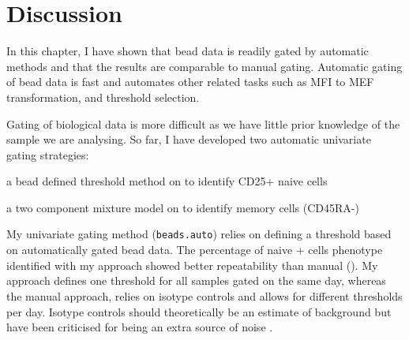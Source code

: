 \section{Discussion}

%
In this chapter, I have shown that bead data is readily gated by automatic methods and that the results are comparable to manual gating.
Automatic gating of bead data is fast and automates other related tasks such as MFI to MEF transformation, and threshold selection.

Gating of biological data is more difficult as we have little prior knowledge of the sample we are analysing.
So far, I have developed two automatic univariate gating strategies:
\begin{itemise}
\item a bead defined threshold method on  to identify CD25+ naive cells
\item a two component mixture model on  to identify memory cells (CD45RA-)
\end{itemise}

My  univariate gating method (\texttt{beads.auto}) relies on defining a threshold based on automatically gated bead data.
The percentage of naive + cells phenotype identified with my approach showed better repeatability than manual ().
My approach defines one threshold for all samples gated on the same day,
whereas the manual approach, relies on isotype controls and allows for different thresholds per day.
Isotype controls should theoretically be an estimate of background but have been criticised for being an extra source of noise \citep{OGorman:1999vd}.


